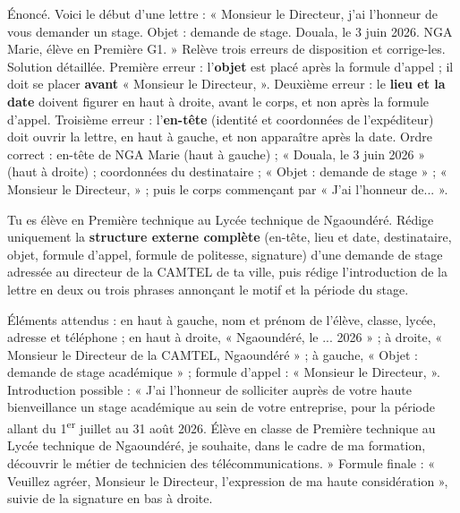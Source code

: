 \documentclass[11pt]{article}
\begin{document}
\begin{exoresolu}
Énoncé. Voici le début d'une lettre : « Monsieur le Directeur, j'ai l'honneur de vous demander un stage. Objet : demande de stage. Douala, le 3 juin 2026. NGA Marie, élève en Première G1. » Relève trois erreurs de disposition et corrige-les.
\tcblower
Solution détaillée. Première erreur : l'\textbf{objet} est placé après la formule d'appel ; il doit se placer \textbf{avant} « Monsieur le Directeur, ». Deuxième erreur : le \textbf{lieu et la date} doivent figurer en haut à droite, avant le corps, et non après la formule d'appel. Troisième erreur : l'\textbf{en-tête} (identité et coordonnées de l'expéditeur) doit ouvrir la lettre, en haut à gauche, et non apparaître après la date. Ordre correct : en-tête de NGA Marie (haut à gauche) ; « Douala, le 3 juin 2026 » (haut à droite) ; coordonnées du destinataire ; « Objet : demande de stage » ; « Monsieur le Directeur, » ; puis le corps commençant par « J'ai l'honneur de... ».
\end{exoresolu}

\begin{exercice}
Tu es élève en Première technique au Lycée technique de Ngaoundéré. Rédige uniquement la \textbf{structure externe complète} (en-tête, lieu et date, destinataire, objet, formule d'appel, formule de politesse, signature) d'une demande de stage adressée au directeur de la CAMTEL de ta ville, puis rédige l'introduction de la lettre en deux ou trois phrases annonçant le motif et la période du stage.
\end{exercice}

\begin{corrige}
Éléments attendus : en haut à gauche, nom et prénom de l'élève, classe, lycée, adresse et téléphone ; en haut à droite, « Ngaoundéré, le ... 2026 » ; à droite, « Monsieur le Directeur de la CAMTEL, Ngaoundéré » ; à gauche, « Objet : demande de stage académique » ; formule d'appel : « Monsieur le Directeur, ». Introduction possible : « J'ai l'honneur de solliciter auprès de votre haute bienveillance un stage académique au sein de votre entreprise, pour la période allant du 1\textsuperscript{er} juillet au 31 août 2026. Élève en classe de Première technique au Lycée technique de Ngaoundéré, je souhaite, dans le cadre de ma formation, découvrir le métier de technicien des télécommunications. » Formule finale : « Veuillez agréer, Monsieur le Directeur, l'expression de ma haute considération », suivie de la signature en bas à droite.
\end{corrige}
\end{document}
